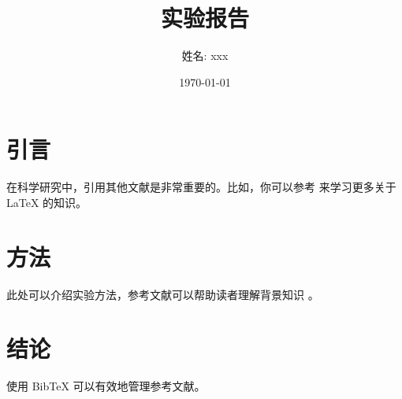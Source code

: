 \documentclass[12pt]{article}
\title{实验报告}
\author{姓名: xxx}
\date{\today}  %
\begin{document}
\maketitle  %

\section{引言}
在科学研究中，引用其他文献是非常重要的。比如，你可以参考 \cite{lamport1994latex} 来学习更多关于 LaTeX 的知识。

\section{方法}
此处可以介绍实验方法，参考文献可以帮助读者理解背景知识 \cite{knuth1984tex}。

\section{结论}
使用 BibTeX 可以有效地管理参考文献。

\end{document}
